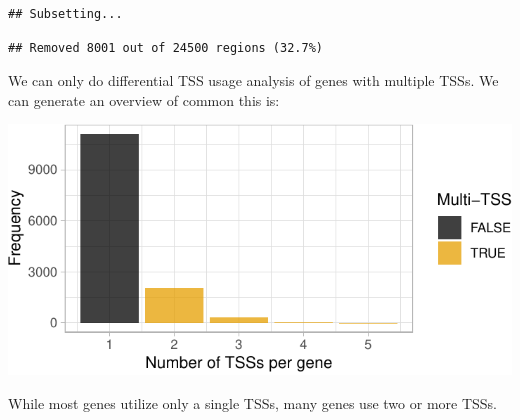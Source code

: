 \documentclass[9pt,a4paper,]{extarticle}
\newenvironment{Shaded}{\begin{snugshade}}{\end{snugshade}}
\newcommand{\KeywordTok}[1]{\textcolor[rgb]{0.13,0.29,0.53}{\textbf{{#1}}}}
\newcommand{\DataTypeTok}[1]{\textcolor[rgb]{0.13,0.29,0.53}{{#1}}}
\newcommand{\DecValTok}[1]{\textcolor[rgb]{0.00,0.00,0.81}{{#1}}}
\newcommand{\FloatTok}[1]{\textcolor[rgb]{0.00,0.00,0.81}{{#1}}}
\newcommand{\StringTok}[1]{\textcolor[rgb]{0.31,0.60,0.02}{{#1}}}
\newcommand{\NormalTok}[1]{{#1}}
\begin{document}
\begin{verbatim}
## Subsetting...
\end{verbatim}

\begin{verbatim}
## Removed 8001 out of 24500 regions (32.7%)
\end{verbatim}

We can only do differential TSS usage analysis of genes with multiple TSSs. We can generate an overview of common this is:

\begin{Shaded}
\end{Shaded}

\begin{center}\includegraphics{CAGEWorkflow_files/figure-latex/TSSstructure-1} \end{center}

While most genes utilize only a single TSSs, many genes use two or more TSSs.
\end{document}
